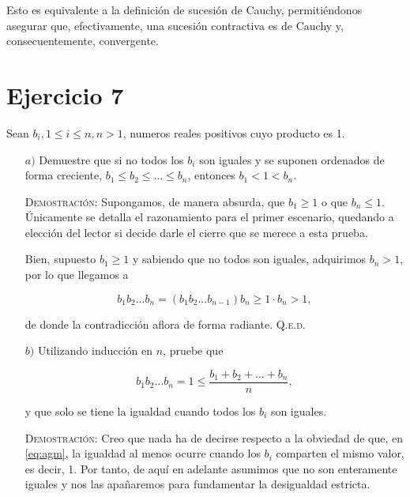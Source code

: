 \documentclass{article}
\begin{document}
Esto es equivalente a la definición de sucesión de Cauchy, permitiéndonos asegurar que, efectivamente, una sucesión contractiva es de Cauchy y, consecuentemente, convergente.

\newpage

\section{Ejercicio 7}

Sean $b_i, 1 \leq i \leq n, n > 1$, numeros reales positivos cuyo producto es 1.

\begin{itemize}
    \item[$a)$] Demuestre que si no todos los $b_i$ son iguales y se suponen ordenados de forma creciente,
    $b_1 \leq b_2 \leq ... \leq b_n$, entonces $b_1 < 1 < b_n$.

    \vspace{7px}

    \textsc{Demostración}: Supongamos, de manera absurda, que $b_1 \geq 1$ o que $b_n \leq 1$. Únicamente se detalla el razonamiento para el primer escenario, quedando a elección del lector si decide darle el cierre que se merece a esta prueba.

    Bien, supuesto $b_1 \geq 1$ y sabiendo que no todos son iguales, adquirimos $b_n > 1$, por lo que llegamos a

    \[b_1b_2...b_n = (b_1b_2...b_{n-1})b_n \geq 1 \cdot b_n > 1,\]

    de donde la contradicción aflora de forma radiante. \hfill{\textsc{Q.e.d.}}

    \item[$b)$] Utilizando inducción en $n$, pruebe que
    
    \begin{equation}
        b_1b_2...b_n = 1 \leq \frac{b_1 + b_2 + ... + b_n}{n},
        \label{eq:agm}
    \end{equation}

    y que solo se tiene la igualdad cuando todos los $b_i$ son iguales.

    \vspace{7px}

    \textsc{Demostración}: Creo que nada ha de decirse respecto a la obviedad de que, en \eqref{eq:agm}, la igualdad al menos ocurre cuando los $b_i$ comparten el mismo valor, es decir, 1.
    Por tanto, de aquí en adelante asumimos que no son enteramente iguales y nos las apañaremos para fundamentar la desigualdad estricta.


\end{itemize}
\end{document}
